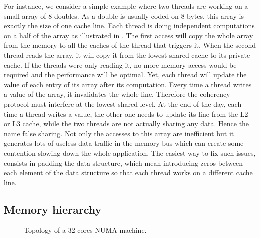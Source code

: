 For instance, we  consider a simple example where two threads are working on a small array of $8$ doubles.
As a double is usually coded on $8$ bytes, this array is exactly the size of one cache line.
Each thread is doing independent computations on a half of the array as illustrated in .
The first access will copy the whole array from the memory to all the caches of the thread that triggers it.
When the second thread reads the array, it will copy it from the lowest shared cache to its private cache.
If the threads were only reading it, no more memory access would be required and the performance will be optimal.
Yet, each thread will update the value of each entry of its array after its computation.
Every time a thread writes a value of the array, it invalidates the whole line.
Therefore the coherency protocol must interfere at the lowest shared level.
At the end of the day, each time a thread writes a value, the other one needs to update its line from the L2 or L3 cache, while the two threads are not actually sharing any data.
Hence the name false sharing.
Not only the accesses to this array are inefficient but it generates lots of useless data traffic in the memory bus which can create some contention slowing down the whole application.
The easiest way to fix such issues, consists in padding the data structure, which mean introducing zeros between each element of the data structure so that each thread works on a different cache line.

\subsection{Memory hierarchy}

\begin{figure}[htb]
    \centering
    
    \caption{Topology of a 32 cores NUMA machine.}
    \label{fig:topo-NUMA}
\end{figure}

